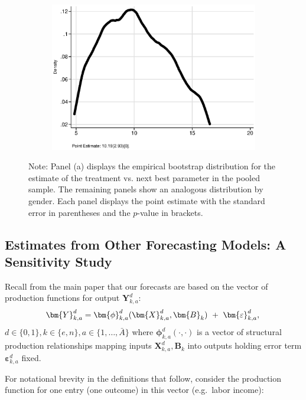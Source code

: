 \begin{figure}
\begin{subfigure}[h]{0.35\textwidth}
		\includegraphics[width=\textwidth]{output/ratios_2_sexm.eps}
\end{subfigure}
\footnotesize \justify
Note: Panel (a) displays the empirical bootstrap distribution for the estimate of the treatment vs. next best parameter in the pooled sample. The remaining panels show an analogous distribution by gender. Each panel displays the point estimate with the standard error in parentheses and the $p$-value in brackets.\end{figure}
\restoregeometry
\doublespacing

\subsection{Estimates from Other Forecasting Models: A Sensitivity Study} \label{appendix:predsensitivity}


Recall from the main paper that our forecasts are based on the vector of production functions for output $\bm{Y}^d_{k,a}$:
\begin{equation}
\bm{Y}^d_{k,a} = \bm{\phi}^d_{k,a} (\bm{X}^d_{k,a}, \bm{B}_k) \ + \ \bm{\varepsilon}^d_{k,a},  \label{eq:outcome2} \\
\end{equation}
$d \in\{0,1\},  k\in\{e,n\}, a\in\{1,\dots,\bar{A}\}$ where $\bm{\phi}^d_{k,a}\left( \cdot, \cdot \right)$ is a vector of structural production relationships mapping inputs $\bm{X}^d_{k,a}, \bm{B}_k$ into outputs holding error term $\bm{\varepsilon}^d_{k,a}$ fixed.

For notational brevity in the definitions that follow, consider the production function for one entry (one outcome) in this vector (e.g.\ labor income):

